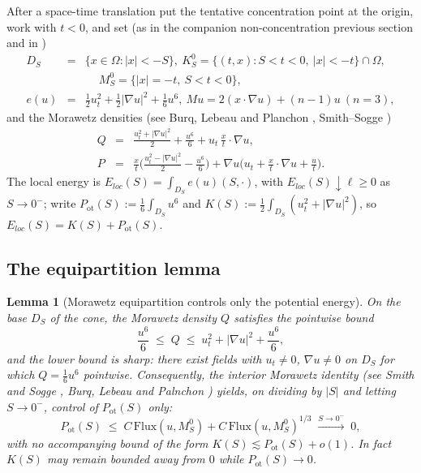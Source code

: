 \documentclass[11pt,letterpaper]{amsart}
\newtheorem{lemma}[theorem]{Lemma}
\newcommand{\Om}{\Omega}
\begin{document}
After a space-time translation put the tentative concentration point at the origin, work with
$t<0$, and set (as in the companion non-concentration previous section and in \cite{SmithSogge1995} \cite{BurqLebeauPlanchon})
\begin{eqnarray*}
D_S&=&\{x\in\Om:|x|<-S\},~ K_S^0=\{(t,x):S<t<0,\ |x|<-t\}\cap\Om,\\
&&\quad ~ M_S^0=\{|x|=-t,\ S<t<0\},\\
e(u)&=&\tfrac12u_t^2+\tfrac12|\nabla u|^2+\tfrac16u^6,~Mu=2(x\cdot\nabla u)+(n-1)u ~(n=3),
\end{eqnarray*}
and the Morawetz densities (see Burq, Lebeau and Planchon \cite{BurqLebeauPlanchon}, Smith--Sogge \cite{SmithSogge1995})
\begin{eqnarray*}
Q&=&\frac{u_t^2+|\nabla u|^2}{2}+\frac{u^6}{6}+u_t\,\frac{x}{t}\cdot\nabla u,\\
P&=&\frac{x}{t}\Big(\frac{u_t^2-|\nabla u|^2}{2}-\frac{u^6}{6}\Big)+\nabla u\Big(u_t+\frac{x}{t}\cdot\nabla u+\frac{u}{t}\Big).
\end{eqnarray*}
The local energy is $E_{loc}(S)=\int_{D_S}e(u)(S,\cdot)$, with $E_{loc}(S)\downarrow\ell\ge0$ as
$S\to0^-$; write $P_{\mathrm{ot}}(S):=\tfrac16\int_{D_S}u^6$ and
$K(S):=\tfrac12\int_{D_S}(u_t^2+|\nabla u|^2)$, so $E_{loc}(S)=K(S)+P_{\mathrm{ot}}(S)$.


\subsection{The equipartition lemma}

\begin{lemma}[Morawetz equipartition controls only the potential energy]\label{lem:equi}
On the base $D_S$ of the cone, the Morawetz density $Q$ satisfies the pointwise bound
\begin{equation}\label{eq:Qbound}
\frac{u^6}{6} \;\le\; Q \;\le\; u_t^2+|\nabla u|^2+\frac{u^6}{6},
\end{equation}
and the lower bound is \emph{sharp}: there exist fields with $u_t\ne0$, $\nabla u\ne0$ on $D_S$
for which $Q=\tfrac16u^6$ pointwise. Consequently, the interior Morawetz identity
(see Smith and Sogge \cite{SmithSogge1995}, Burq, Lebeau and Palnchon \cite[(3.11)--(3.12)]{BurqLebeauPlanchon}) yields, on dividing by $|S|$ and letting
$S\to0^-$, control of $P_{\mathrm{ot}}(S)$ only:
\begin{equation}\label{eq:pot-only}
P_{\mathrm{ot}}(S) \;\le\; C\,\mathrm{Flux}(u,M_S^0)+C\,\mathrm{Flux}(u,M_S^0)^{1/3} \;\xrightarrow{S\to0^-}\;0,
\end{equation}
with \emph{no} accompanying bound of the form $K(S)\lesssim P_{\mathrm{ot}}(S)+o(1)$. In fact
$K(S)$ may remain bounded away from $0$ while $P_{\mathrm{ot}}(S)\to0$.
\end{lemma}
\end{document}
